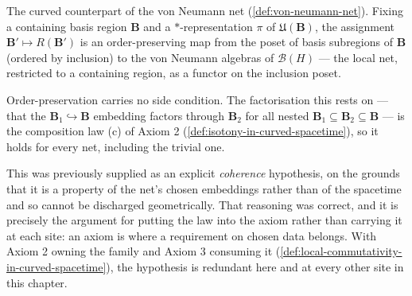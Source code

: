 \begin{definition}
    \label{def:von-neumann-net-in-curved-spacetime}
    \leanok
    The curved counterpart of the von Neumann net (\ref{def:von-neumann-net}). Fixing a containing basis region $\mathbf{B}$ and a $*$-representation $\pi$ of $\mathfrak{U}(\mathbf{B})$, the assignment $\mathbf{B}' \mapsto R(\mathbf{B}')$ is an order-preserving map from the poset of basis subregions of $\mathbf{B}$ (ordered by inclusion) to the von Neumann algebras of $\mathcal{B}(H)$ --- the local net, restricted to a containing region, as a functor on the inclusion poset.

    Order-preservation carries no side condition. The factorisation this rests on --- that the $\mathbf{B}_1 \hookrightarrow \mathbf{B}$ embedding factors through $\mathbf{B}_2$ for all nested $\mathbf{B}_1 \subseteq \mathbf{B}_2 \subseteq \mathbf{B}$ --- is the composition law (c) of Axiom 2 (\ref{def:isotony-in-curved-spacetime}), so it holds for every net, including the trivial one.

    This was previously supplied as an explicit \emph{coherence} hypothesis, on the grounds that it is a property of the net's chosen embeddings rather than of the spacetime and so cannot be discharged geometrically. That reasoning was correct, and it is precisely the argument for putting the law into the axiom rather than carrying it at each site: an axiom is where a requirement on chosen data belongs. With Axiom 2 owning the family and Axiom 3 consuming it (\ref{def:local-commutativity-in-curved-spacetime}), the hypothesis is redundant here and at every other site in this chapter.
\end{definition}

